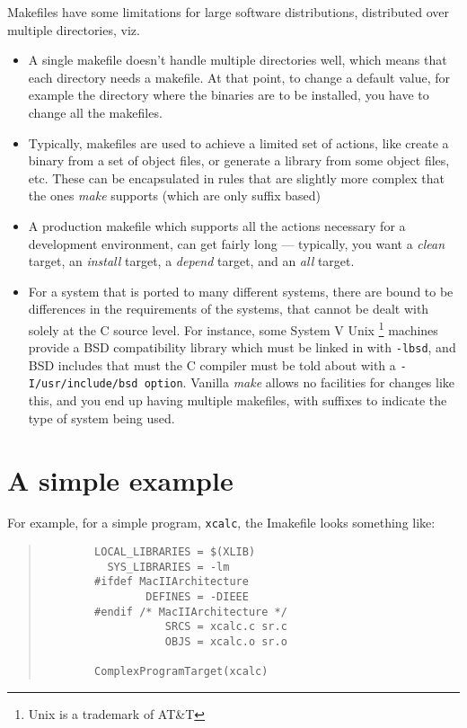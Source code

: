 Makefiles have some limitations for large software distributions,
distributed over multiple directories, viz.

\begin{itemize}

\item A single makefile doesn't handle multiple directories well,
        which means that each directory needs a makefile. At that
        point, to change a default value, for example the directory
        where the binaries are to be installed, you have to change all
        the makefiles.

\item Typically, makefiles are used to achieve a limited set of
        actions, like create a binary from a set of object files, or
        generate a library from some object files, etc. These can be
        encapsulated in rules that are slightly more complex that the
        ones {\em make} supports (which are only suffix based)

\item A production makefile which supports all the actions necessary
        for a development environment, can get fairly long ---
        typically, you want a {\em clean} target, an {\em install}
        target, a {\em depend} target, and an {\em all} target.

\item For a system that is ported to many different systems, there are
		bound to be differences in the requirements of the systems,
		that cannot be dealt with solely at the C source level. For
		instance, some System V Unix \footnote{Unix is a trademark of
		AT\&T} machines provide a BSD compatibility library which must
		be linked in with {\tt -lbsd}, and BSD includes that must the
		C compiler must be told about with a {\tt -I/usr/include/bsd
		option}. Vanilla {\em make} allows no facilities for changes
		like this, and you end up having multiple makefiles, with
		suffixes to indicate the type of system being used.
\end{itemize}

\section{A simple example}
For example, for a simple program, {\tt xcalc}, the Imakefile looks something
like:

\begin{quote}
\begin{verbatim}
        LOCAL_LIBRARIES = $(XLIB)
          SYS_LIBRARIES = -lm
        #ifdef MacIIArchitecture
                DEFINES = -DIEEE
        #endif /* MacIIArchitecture */
                   SRCS = xcalc.c sr.c
                   OBJS = xcalc.o sr.o
        
        ComplexProgramTarget(xcalc)
\end{verbatim}
\end{quote}

